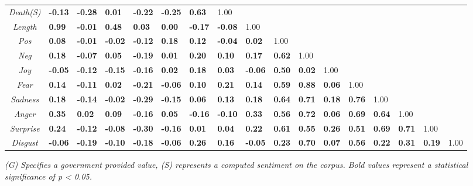 \begin{landscape}
\begin{table}[]
{\begin{tabular}{@{}|c|llllllllllllllll|@{}}
\textit{Death(S)} & \textbf{-0.13} & \textbf{-0.28} & \textbf{0.01} & \textbf{-0.22} & \textbf{-0.25} & \textbf{0.63} & 1.00 & \textbf{} & \textbf{} & \textbf{} & \textbf{} & \textbf{} & \textbf{} & \textbf{} & \textbf{} & \textbf{} \\
\textit{Length} & \textbf{0.99} & \textbf{-0.01} & \textbf{0.48} & \textbf{0.03} & \textbf{0.00} & \textbf{-0.17} & \textbf{-0.08} & 1.00 & \textbf{} & \textbf{} & \textbf{} & \textbf{} & \textbf{} & \textbf{} & \textbf{} & \textbf{} \\
\textit{Pos} & \textbf{0.08} & \textbf{-0.01} & \textbf{-0.02} & \textbf{-0.12} & \textbf{0.18} & \textbf{0.12} & \textbf{-0.04} & \textbf{0.02} & 1.00 & \textbf{} & \textbf{} & \textbf{} & \textbf{} & \textbf{} & \textbf{} & \textbf{} \\
\textit{Neg} & \textbf{0.18} & \textbf{-0.07} & \textbf{0.05} & \textbf{-0.19} & \textbf{0.01} & \textbf{0.20} & \textbf{0.10} & \textbf{0.17} & \textbf{0.62} & 1.00 & \textbf{} & \textbf{} & \textbf{} & \textbf{} & \textbf{} & \textbf{} \\
\textit{Joy} & \textbf{-0.05} & \textbf{-0.12} & \textbf{-0.15} & \textbf{-0.16} & \textbf{0.02} & \textbf{0.18} & \textbf{0.03} & \textbf{-0.06} & \textbf{0.50} & \textbf{0.02} & 1.00 & \textbf{} & \textbf{} & \textbf{} & \textbf{} & \textbf{} \\
\textit{Fear} & \textbf{0.14} & \textbf{-0.11} & \textbf{0.02} & \textbf{-0.21} & \textbf{-0.06} & \textbf{0.10} & \textbf{0.21} & \textbf{0.14} & \textbf{0.59} & \textbf{0.88} & \textbf{0.06} & 1.00 & \textbf{} & \textbf{} & \textbf{} & \textbf{} \\
\textit{Sadness} & \textbf{0.18} & \textbf{-0.14} & \textbf{-0.02} & \textbf{-0.29} & \textbf{-0.15} & \textbf{0.06} & \textbf{0.13} & \textbf{0.18} & \textbf{0.64} & \textbf{0.71} & \textbf{0.18} & \textbf{0.76} & 1.00 & \textbf{} & \textbf{} & \textbf{} \\
\textit{Anger} & \textbf{0.35} & \textbf{0.02} & \textbf{0.09} & \textbf{-0.16} & \textbf{0.05} & \textbf{-0.16} & \textbf{-0.10} & \textbf{0.33} & \textbf{0.56} & \textbf{0.72} & \textbf{0.06} & \textbf{0.69} & \textbf{0.64} & 1.00 & \textbf{} & \textbf{} \\
\textit{Surprise} & \textbf{0.24} & \textbf{-0.12} & \textbf{-0.08} & \textbf{-0.30} & \textbf{-0.16} & \textbf{0.01} & \textbf{0.04} & \textbf{0.22} & \textbf{0.61} & \textbf{0.55} & \textbf{0.26} & \textbf{0.51} & \textbf{0.69} & \textbf{0.71} & 1.00 & \textbf{} \\
\textit{Disgust} & \textbf{-0.06} & \textbf{-0.19} & \textbf{-0.10} & \textbf{-0.18} & \textbf{-0.06} & \textbf{0.26} & \textbf{0.16} & \textbf{-0.05} & \textbf{0.23} & \textbf{0.70} & \textbf{0.07} & \textbf{0.56} & \textbf{0.22} & \textbf{0.31} & \textbf{0.19} & 1.00 \\ \bottomrule
\end{tabular}%
}
\emph{(G) Specifies a government provided value, (S) represents a computed sentiment on the corpus. Bold values represent a statistical significance of p < 0.05.}
\end{table}
\end{landscape}

